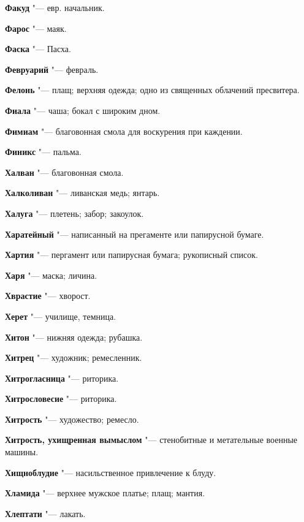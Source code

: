 \begin{mymulticols}
\bukvaending


\noindent\textbf{Факуд} "--- евр. начальник. 

\noindent\textbf{Фарос} "--- маяк. 

\noindent\textbf{Фаска} "--- Пасха. 

\noindent\textbf{Февруарий} "--- февраль. 

\noindent\textbf{Фелонь} "--- плащ; верхняя одежда; одно из священных облачений пресвитера. 

\noindent\textbf{Фиала} "--- чаша; бокал с широким дном. 

\noindent\textbf{Фимиам} "--- благовонная смола для воскурения при каждении. 

\noindent\textbf{Финикс} "--- пальма. 

\bukvaending


\noindent\textbf{Халван} "--- благовонная смола. 

\noindent\textbf{Халколиван} "--- ливанская медь; янтарь. 

\noindent\textbf{Халуга} "--- плетень; забор; закоулок. 

\noindent\textbf{Харатейный} "--- написанный на прегаменте или папирусной бумаге. 

\noindent\textbf{Хартия} "--- пергамент или папирусная бумага; рукописный список. 

\noindent\textbf{Харя} "--- маска; личина. 

\noindent\textbf{Хврастие} "--- хворост. 

\noindent\textbf{Херет} "--- училище, темница. 

\noindent\textbf{Хитон} "--- нижняя одежда; рубашка. 

\noindent\textbf{Хитрец} "--- художник; ремесленник. 

\noindent\textbf{Хитрогласница} "--- риторика. 

\noindent\textbf{Хитрословесие} "--- риторика. 

\noindent\textbf{Хитрость} "--- художество; ремесло. 

\noindent\textbf{Хитрость, ухищренная вымыслом} "--- стенобитные и метательные военные машины. 

\noindent\textbf{Хищноблудие} "--- насильственное привлечение к блуду. 

\noindent\textbf{Хламида} "--- верхнее мужское платье; плащ; мантия. 

\noindent\textbf{Хлептати} "--- лакать. 


\end{mymulticols}
